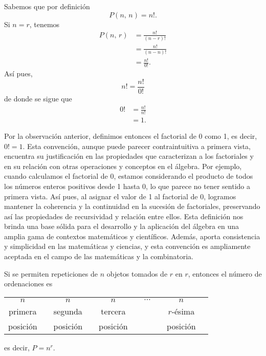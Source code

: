 \begin{obs}{}{}
    Sabemos que por definición
    $$P(n, \, n) = n!.$$
    Si $n = r$, tenemos
    \begin{align*}
        P(n, \, r) & = \frac{n!}{(n-r)!} \\
        & = \frac{n!}{(n-n)!} \\
        & = \frac{n!}{0!}.
    \end{align*}
    Así pues,
    $$n! = \frac{n!}{0!}$$
    de donde se sigue que
    \begin{align*}
        0! & = \frac{n!}{n!} \\
        & = 1.
    \end{align*}
\end{obs}

\begin{importante}
    Por la observación anterior, definimos entonces el factorial de 0 como 1, es decir, $0! = 1$. Esta convención, aunque puede parecer contraintuitiva a primera vista, encuentra su justificación en las propiedades que caracterizan a los factoriales y en su relación con otras operaciones y conceptos en el álgebra. Por ejemplo, cuando calculamos el factorial de 0, estamos considerando el producto de todos los números enteros positivos desde 1 hasta 0, lo que parece no tener sentido a primera vista. Así pues, al asignar el valor de 1 al factorial de 0, logramos mantener la coherencia y la continuidad en la sucesión de factoriales, preservando así las propiedades de recursividad y relación entre ellos.  Esta definición nos brinda una base sólida para el desarrollo y la aplicación del álgebra en una amplia gama de contextos matemáticos y científicos. Además, aporta consistencia y simplicidad en las matemáticas y ciencias, y esta convención es ampliamente aceptada en el campo de las matemáticas y la combinatoria.
\end{importante}

\begin{importante}
    Si se permiten repeticiones de $n$ objetos tomados de $r$ en $r$, entonces el número de ordenaciones es
    \begin{center}
        \begin{tabular}{cccccccccc}
            $n$ & & $n$ & & $n$ & & $\cdots$ & & $n$ \\
            primera & & segunda & & tercera & &  & & $r$-ésima \\
            posición & & posición & & posición & &  & & posición
        \end{tabular}
    \end{center}
    es decir, $P = n^r$.
\end{importante}

